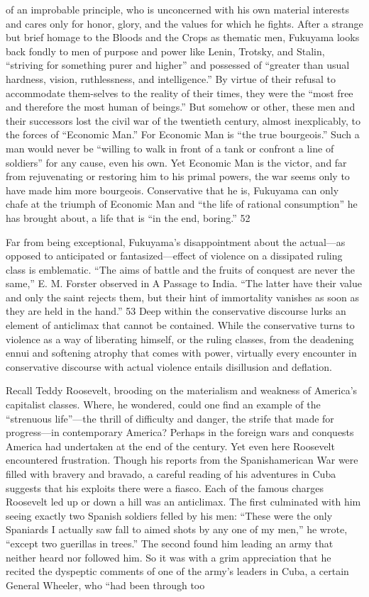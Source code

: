 of an improbable principle, who is unconcerned with his own material interests and cares only for honor, glory, and the values for which he fights. After a strange but brief homage to the Bloods and the Crops as thematic men, Fukuyama looks back fondly to men of purpose and power like Lenin, Trotsky, and Stalin, “striving for something purer and higher” and possessed of “greater than usual hardness, vision, ruthlessness, and intelligence.” By virtue of their refusal to accommodate them-selves to the reality of their times, they were the “most free and therefore the most human of beings.” But somehow or other, these men and their successors lost the civil war of the twentieth century, almost inexplicably, to the forces of “Economic Man.” For Economic Man is “the true bourgeois.” Such a man would never be “willing to walk in front of a tank or confront a line of soldiers” for any cause, even his own. Yet Economic Man is the victor, and far from rejuvenating or restoring him to his primal powers, the war seems only to have made him more bourgeois. Conservative that he is, Fukuyama can only chafe at the triumph of Economic Man and “the life of rational consumption” he has brought about, a life that is “in the end, boring.” {\color{blue} 52 } {\par} Far from being exceptional, Fukuyama’s disappointment about the actual—as opposed to anticipated or fantasized—effect of violence on a dissipated ruling class is emblematic. “The aims of battle and the fruits of conquest are never the same,” E. M. Forster observed in A Passage to India. “The latter have their value and only the saint rejects them, but their hint of immortality vanishes as soon as they are held in the hand.” {\color{blue} 53 } Deep within the conservative discourse lurks an element of anticlimax that cannot be contained. While the conservative turns to violence as a way of liberating himself, or the ruling classes, from the deadening ennui and softening atrophy that comes with power, virtually every encounter in conservative discourse with actual violence entails disillusion and deflation.{\par} Recall Teddy Roosevelt, brooding on the materialism and weakness of America’s capitalist classes. Where, he wondered, could one find an example of the “strenuous life”—the thrill of difficulty and danger, the strife that made for progress—in contemporary America? Perhaps in the foreign wars and conquests America had undertaken at the end of the century. Yet even here Roosevelt encountered frustration. Though his reports from the Spanishamerican War were filled with bravery and bravado, a careful reading of his adventures in Cuba suggests that his exploits there were a fiasco. Each of the famous charges Roosevelt led up or down a hill was an anticlimax. The first culminated with him seeing exactly two Spanish soldiers felled by his men: “These were the only Spaniards I actually saw fall to aimed shots by any one of my men,” he wrote, “except two guerillas in trees.” The second found him leading an army that neither heard nor followed him. So it was with a grim appreciation that he recited the dyspeptic comments of one of the army’s leaders in Cuba, a certain General Wheeler, who “had been through too 